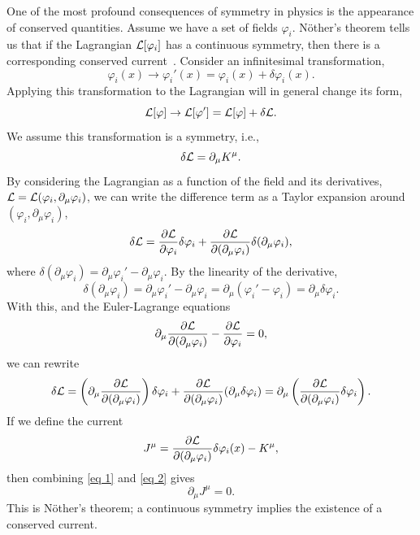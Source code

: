 One of the most profound consequences of symmetry in physics is the appearance of conserved quantities.
Assume we have a set of fields $\varphi_i$. Nöther's theorem tells us that if the Lagrangian $\mathcal{L}[\varphi_i]$ has a continuous symmetry, then there is a corresponding conserved current~\autocite{carrollSpacetimeGeometryIntroduction2019,peskinIntroductionQuantumField1995}.
Consider an infinitesimal transformation,
%
\begin{equation}
    \varphi_i(x) \longrightarrow \varphi_i'(x)
    = \varphi_i(x) + \delta \varphi_i(x).
\end{equation}
%
Applying this transformation to the Lagrangian will in general change its form,
%
\begin{equation}
    \mathcal{L}[\varphi] \rightarrow \mathcal{L}[\varphi']
    = \mathcal{L}[\varphi] + \delta \mathcal{L}.
\end{equation}
%
We assume this transformation is a symmetry, i.e.,
%
\begin{equation}
    \label{eq 1}
    \delta \mathcal{L} = \partial_\mu K^\mu.
\end{equation}
%
By considering the Lagrangian as a function of the field and its derivatives, $\mathcal{L} = \mathcal{L}(\varphi_i, \partial_\mu \varphi_i)$, we can write the difference term as a Taylor expansion around $(\varphi_i, \partial_\mu \varphi_i)$,
%
\begin{align}
    \delta \mathcal{L}
    = \pdv{\mathcal{L}}{\varphi_i} \delta \varphi_i
    + \pdv{\mathcal{L}}{(\partial_\mu \varphi_i)} \delta (\partial_\mu \varphi_i),
\end{align}
%
where $\delta (\partial_\mu \varphi_i) = \partial_\mu \varphi_i' - \partial_\mu \varphi_i$.
By the linearity of the derivative,
%
\begin{equation}
    \delta (\partial_\mu \varphi_i)
    = \partial_\mu \varphi_i' - \partial_\mu \varphi_i
    = \partial_\mu (\varphi_i' - \varphi_i)
    = \partial_\mu \delta \varphi_i.
\end{equation}
%
With this, and the Euler-Lagrange equations
%
\begin{equation}
    \partial_\mu \pdv{\mathcal{L}}{(\partial_\mu \varphi_i)} - \pdv{\mathcal{L}}{\varphi_i} = 0,
\end{equation}
%
we can rewrite
%
\begin{equation}
    \label{eq 2}
    \delta \mathcal{L} = \left( \partial_\mu \pdv{\mathcal{L}}{(\partial_\mu \varphi_i)} \right) \delta \varphi_i
    + \pdv{\mathcal{L}}{(\partial_\mu \varphi_i)} (\partial_\mu \delta \varphi_i)
    = \partial_\mu \left(\pdv{\mathcal{L}}{(\partial_\mu \varphi_i)} \delta \varphi_i\right).
\end{equation}
%
If we define the current
%
\begin{equation}
    J^\mu = \pdv{\mathcal{L}}{(\partial_\mu \varphi_i)} \delta \varphi_i(x) - K^\mu,
\end{equation}
%
then combining \autoref{eq 1} and \autoref{eq 2} gives
%
\begin{equation}
    \label{Nothers theorem}
    \partial_\mu J^\mu = 0.
\end{equation}
%
This is Nöther's theorem; a continuous symmetry implies the existence of a conserved current.

